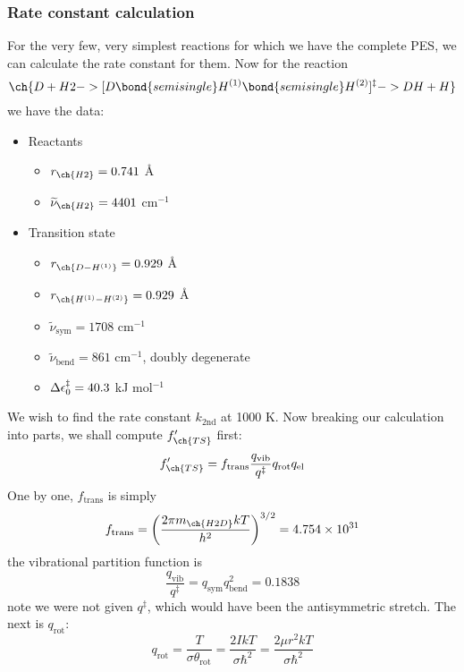 \subsubsection{Rate constant calculation}
For the very few, very simplest reactions for which we have the complete PES, we can calculate the rate constant for them. Now for the reaction
\begin{equation*}
  \ch{D + H2 -> [D\bond{semisingle}H^{(1)}\bond{semisingle}H^{(2)}]^{\ddag} -> DH + H }
\end{equation*}
we have the data:
\begin{itemize}
  \item Reactants
  \begin{itemize}
    \item $r_{\ch{H2}}=0.741$ \AA
    \item $\widetilde{\nu}_{\ch{H2}}=4401$ cm$^{-1}$
  \end{itemize}
  \item Transition state
  \begin{itemize}
    \item $r_{\ch{D-H^{(1)}}}=0.929$ \AA
    \item $r_{\ch{H^{(1)}-H^{(2)}}}=0.929$ \AA
    \item $\widetilde{\nu}_{\text{sym}}=1708$ cm$^{-1}$
    \item $\widetilde{\nu}_{\text{bend}}=861$ cm$^{-1}$, doubly degenerate
    \item $\Delta\epsilon_0^{\ddag}=40.3$ kJ mol$^{-1}$
  \end{itemize}
\end{itemize}
We wish to find the rate constant $k_{\text{2nd}}$ at 1000 K. Now breaking our calculation into parts, we shall compute $f'_{\ch{TS}}$ first:
\begin{equation}
  f'_{\ch{TS}}=f_{\text{trans}}\frac{q_{\text{vib}}}{q^{\ddag}}q_{\text{rot}}q_{\text{el}}
\end{equation}
One by one, $f_{\text{trans}}$ is simply
\begin{equation}
  f_{\text{trans}}=\lf(\frac{2\pi m_{\ch{H2D}}kT}{h^2} \rt)^{3/2}=4.754\times10^{31}
\end{equation}
the vibrational partition function is
\begin{equation}
  \frac{q_{\text{vib}}}{q^{\ddag }}=q_{\text{sym}}q^2_{\text{bend}}=0.1838
\end{equation}
note we were not given $q^{\ddag}$, which would have been the antisymmetric stretch. The next is $q_{\text{rot}}$:
\begin{equation}
  q_{\text{rot}}=\frac{T}{\sigma\theta_{\text{rot}}}=\frac{2IkT}{\sigma\hbar^2}=\frac{2\mu r^2kT}{\sigma\hbar^2}
\end{equation}
